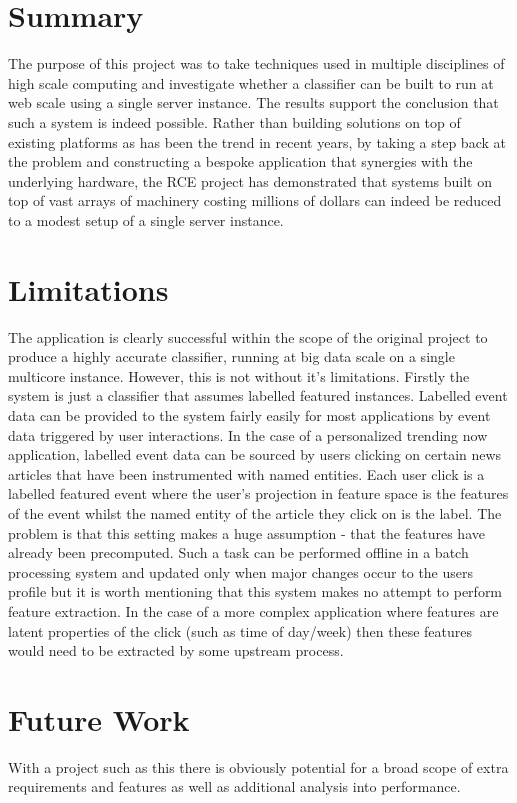 \documentclass[a4paper,11pt]{scrreprt}
\begin{document}
\section{Summary}
The purpose of this project was to take techniques used in multiple disciplines of high scale computing and investigate whether a classifier can be built to run at web scale using a single server instance. The results support the conclusion that such a system is indeed possible. Rather than building solutions on top of existing platforms as has been the trend in recent years, by taking a step back at the problem and constructing a bespoke application that synergies with the underlying hardware, the RCE project has demonstrated that systems built on top of vast arrays of machinery costing millions of dollars can indeed be reduced to a modest setup of a single server instance. 

\section{Limitations}
The application is clearly successful within the scope of the original project to produce a highly accurate classifier, running at big data scale on a single multicore instance. However, this is not without it's limitations. Firstly the system is just a classifier that assumes labelled featured instances. Labelled event data can be provided to the system fairly easily for most applications by event data triggered by user interactions. In the case of a personalized trending now application, labelled event data can be sourced by users clicking on certain news articles that have been instrumented with named entities. Each user click is a labelled featured event where the user's projection in feature space is the features of the event whilst the named entity of the article they click on is the label. The problem is that this setting makes a huge assumption - that the features have already been precomputed. Such a task can be performed offline in a batch processing system and updated only when major changes occur to the users profile but it is worth mentioning that this system makes no attempt to perform feature extraction. In the case of a more complex application where features are latent properties of the click (such as time of day/week) then these features would need to be extracted by some upstream process. 
\section{Future Work}
With a project such as this there is obviously potential for a broad scope of extra requirements and features as well as additional analysis into performance. 
\end{document}
